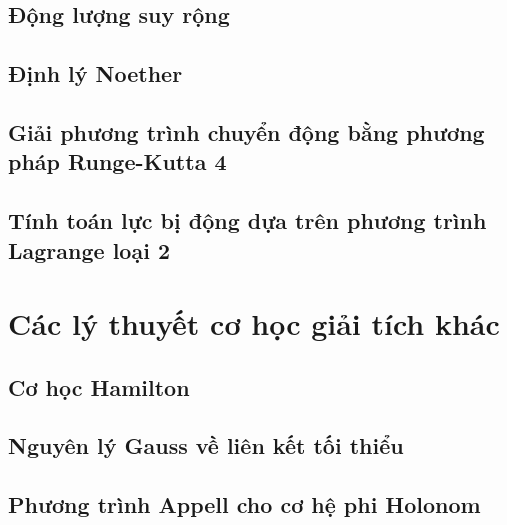\subsection{Động lượng suy rộng}

\subsection{Định lý Noether}



\subsection{Giải phương trình chuyển động bằng phương pháp Runge-Kutta 4}

\subsection{Tính toán lực bị động dựa trên phương trình Lagrange loại 2}

\section{Các lý thuyết cơ học giải tích khác}

\subsection{Cơ học Hamilton}

\subsection{Nguyên lý Gauss về liên kết tối thiểu}

\subsection{Phương trình Appell cho cơ hệ phi Holonom}
